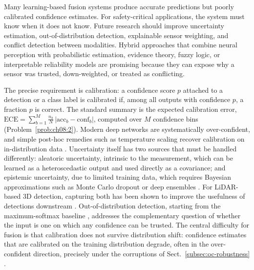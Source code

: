 Many learning-based fusion systems produce accurate predictions but poorly calibrated confidence estimates. For safety-critical applications, the system must know when it does not know. Future research should improve uncertainty estimation, out-of-distribution detection, explainable sensor weighting, and conflict detection between modalities. Hybrid approaches that combine neural perception with probabilistic estimation, evidence theory, fuzzy logic, or interpretable reliability models are promising because they can expose why a sensor was trusted, down-weighted, or treated as conflicting.

The precise requirement is calibration: a confidence score $p$ attached to a detection or a class label is calibrated if, among all outputs with confidence $p$, a fraction $p$ is correct. The standard summary is the expected calibration error, $\mathrm{ECE}=\sum_{b=1}^{M}\frac{n_b}{N}\,\lvert\mathrm{acc}_b-\mathrm{conf}_b\rvert$, computed over $M$ confidence bins (Problem~\ref{prob:ch08:2}). Modern deep networks are systematically over-confident, and simple post-hoc remedies such as temperature scaling recover calibration on in-distribution data \cite{guo2017_calibration}. Uncertainty itself has two sources that must be handled differently: aleatoric uncertainty, intrinsic to the measurement, which can be learned as a heteroscedastic output and used directly as a covariance; and epistemic uncertainty, due to limited training data, which requires Bayesian approximations such as Monte Carlo dropout \cite{gal2016_mcdropout} or deep ensembles \cite{lakshminarayanan2017_ensembles,kendall2017_uncertainties}. For LiDAR-based 3D detection, capturing both has been shown to improve the usefulness of detections downstream \cite{feng2018_lidar_uncertainty}. Out-of-distribution detection, starting from the maximum-softmax baseline \cite{hendrycks2017_ood}, addresses the complementary question of whether the input is one on which any confidence can be trusted. The central difficulty for fusion is that calibration does not survive distribution shift: confidence estimates that are calibrated on the training distribution degrade, often in the over-confident direction, precisely under the corruptions of Sect.~\ref{subsec:oc-robustness} \cite{ovadia2019_shift}.

